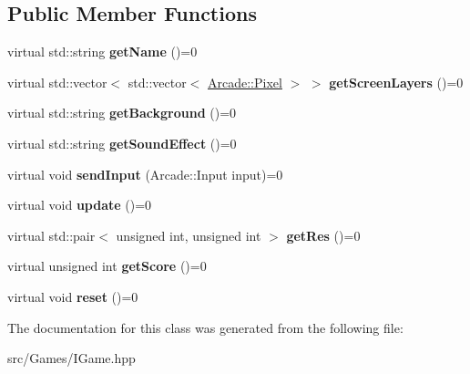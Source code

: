 \subsection*{Public Member Functions}
\begin{DoxyCompactItemize}
\item 
\mbox{\label{class_arcade_1_1_i_game_ab0b047d4495f483a550bd82e17421474}} 
virtual std\+::string {\bfseries get\+Name} ()=0
\item 
\mbox{\label{class_arcade_1_1_i_game_a00035447a2bc30a5ff302fa1b2ad2cb0}} 
virtual std\+::vector$<$ std\+::vector$<$ \mbox{\hyperlink{struct_arcade_1_1_pixel}{Arcade\+::\+Pixel}} $>$ $>$ {\bfseries get\+Screen\+Layers} ()=0
\item 
\mbox{\label{class_arcade_1_1_i_game_aefab20d9b3b0c511f61a6a7fb7fb42a1}} 
virtual std\+::string {\bfseries get\+Background} ()=0
\item 
\mbox{\label{class_arcade_1_1_i_game_a8374f492eb8202280408b34b850a9c55}} 
virtual std\+::string {\bfseries get\+Sound\+Effect} ()=0
\item 
\mbox{\label{class_arcade_1_1_i_game_ae68fc6ff4afc8eca2bc34e10aeb58f4e}} 
virtual void {\bfseries send\+Input} (Arcade\+::\+Input input)=0
\item 
\mbox{\label{class_arcade_1_1_i_game_a667fc6a62d295e0bcb7b84be03672235}} 
virtual void {\bfseries update} ()=0
\item 
\mbox{\label{class_arcade_1_1_i_game_a3f323930377997c179a0d6d806e5f972}} 
virtual std\+::pair$<$ unsigned int, unsigned int $>$ {\bfseries get\+Res} ()=0
\item 
\mbox{\label{class_arcade_1_1_i_game_a81fced9c4187827ce9c763c1d6edc680}} 
virtual unsigned int {\bfseries get\+Score} ()=0
\item 
\mbox{\label{class_arcade_1_1_i_game_ac916c384573ea39ad4989ce89797942a}} 
virtual void {\bfseries reset} ()=0
\end{DoxyCompactItemize}


The documentation for this class was generated from the following file\+:\begin{DoxyCompactItemize}
\item 
src/\+Games/I\+Game.\+hpp\end{DoxyCompactItemize}
